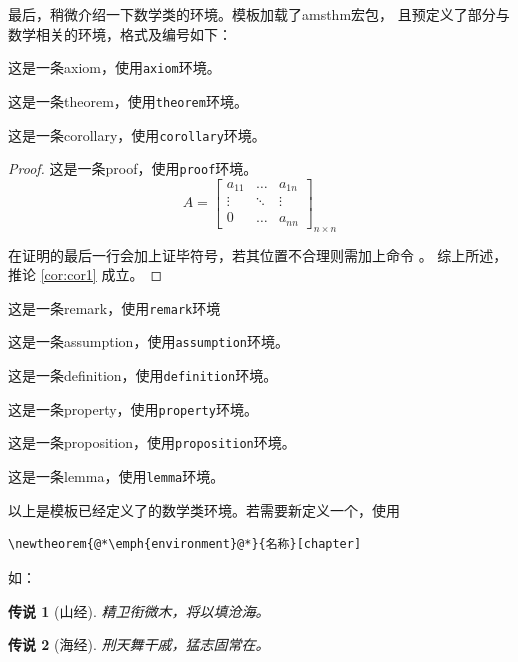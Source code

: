 最后，稍微介绍一下数学类的环境。模板加载了\textsf{amsthm}宏包，
且预定义了部分与数学相关的环境，格式及编号如下：
\begin{axiom}
	这是一条axiom，使用\texttt{axiom}环境。
\end{axiom}
\begin{theorem}[某某定理]   %
	这是一条theorem，使用\texttt{theorem}环境。
\end{theorem}
\begin{corollary}[一条推论]\label{cor:cor1}
	这是一条corollary，使用\texttt{corollary}环境。
\end{corollary}
\begin{proof}
	这是一条proof，使用\texttt{proof}环境。
	\[
		A=\begin{bmatrix}
			a_{11} & \dots  & a_{1n} \\
			\vdots & \ddots & \vdots \\
			0      & \ldots & a_{nn}
		\end{bmatrix}_{n\times n}
	\]

	在证明的最后一行会加上证毕符号，若其位置不合理则需加上命令 。
	综上所述，推论 \ref{cor:cor1} 成立。
\end{proof}
\begin{remark}
	这是一条remark，使用\texttt{remark}环境
\end{remark}
\begin{assumption}
	这是一条assumption，使用\texttt{assumption}环境。
\end{assumption}
\begin{definition}
	这是一条definition，使用\texttt{definition}环境。
\end{definition}
\begin{property}
	这是一条property，使用\texttt{property}环境。
\end{property}
\begin{proposition}
	这是一条proposition，使用\texttt{proposition}环境。
\end{proposition}
\begin{lemma}
	这是一条lemma，使用\texttt{lemma}环境。
\end{lemma}

以上是模板已经定义了的数学类环境。若需要新定义一个，使用
\begin{lstlisting}[numbers=none]
\newtheorem{@*\emph{environment}@*}{名称}[chapter]
		\end{lstlisting}
如：
\newtheorem{tale}{传说}[chapter]	%
\begin{tale}[山经]	  %
	精卫衔微木，将以填沧海。
\end{tale}
\begin{tale}[海经]
	刑天舞干戚，猛志固常在。
\end{tale}



